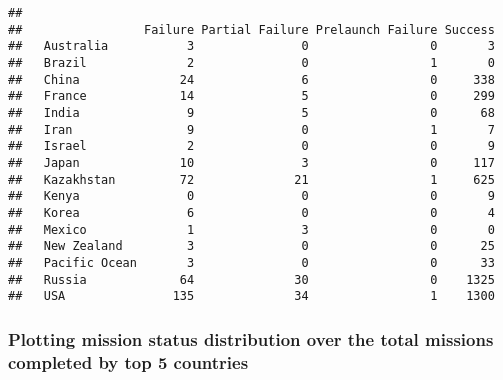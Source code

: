 \documentclass[
]{article}
\newenvironment{Shaded}{\begin{snugshade}}{\end{snugshade}}
\newcommand{\FunctionTok}[1]{\textcolor[rgb]{0.13,0.29,0.53}{\textbf{#1}}}
\newcommand{\NormalTok}[1]{#1}
\newcommand{\SpecialCharTok}[1]{\textcolor[rgb]{0.81,0.36,0.00}{\textbf{#1}}}
\begin{document}
\begin{Shaded}
\end{Shaded}

\begin{verbatim}
##                
##                 Failure Partial Failure Prelaunch Failure Success
##   Australia           3               0                 0       3
##   Brazil              2               0                 1       0
##   China              24               6                 0     338
##   France             14               5                 0     299
##   India               9               5                 0      68
##   Iran                9               0                 1       7
##   Israel              2               0                 0       9
##   Japan              10               3                 0     117
##   Kazakhstan         72              21                 1     625
##   Kenya               0               0                 0       9
##   Korea               6               0                 0       4
##   Mexico              1               3                 0       0
##   New Zealand         3               0                 0      25
##   Pacific Ocean       3               0                 0      33
##   Russia             64              30                 0    1325
##   USA               135              34                 1    1300
\end{verbatim}

\hypertarget{plotting-mission-status-distribution-over-the-total-missions-completed-by-top-5-countries}{%
\subsubsection{Plotting mission status distribution over the total
missions completed by top 5
countries}\label{plotting-mission-status-distribution-over-the-total-missions-completed-by-top-5-countries}}
\end{document}
